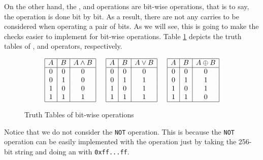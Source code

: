 On the other hand, the \AND, \OR and \XOR operations are bit-wise operations, that is to say, the operation is done bit by bit. As a result, there are not any carries to be considered when operating a pair of bits. As we will see, this is going to make the checks easier to implement for bit-wise operations. Table \ref{tab:truth-tables} depicts the truth tables of \AND, \OR and \XOR operators, respectively.

\begin{figure}[h!]
    \[
    \begin{array}{|c|c|c|}
        \hline
        A 	&B 		&A \land B 	\\
        \hline
        0 	&0 		&0 				\\
        0 	&1 		&0				\\
        1 	&0 		&0 				\\
        1 	&1 		&1 				\\
        \hline
    \end{array}
    \hspace{0.5cm}
    \begin{array}{|c|c|c|}
        \hline
        A 	&B 		&A \lor B 	\\
        \hline
        0 	&0 		&0 				\\
        0 	&1 		&1				\\
        1 	&0 		&1 				\\
        1 	&1 		&1 				\\
        \hline
    \end{array}
    \hspace{0.5cm}
    \begin{array}{|c|c|c|}
        \hline
        A 	&B 		&A \oplus B 	\\
        \hline
        0 	&0 		&0 				\\
        0 	&1 		&1				\\
        1 	&0 		&1 				\\
        1 	&1 		&0 				\\
        \hline
    \end{array}
    \]
    \caption{Truth Tables of bit-wise operations}
    \label{tab:truth-tables}
\end{figure}

Notice that we do not consider the \texttt{NOT} operation. This is because the \texttt{NOT} operation can be easily implemented with the \XOR operation just by taking the 256-bit string and doing an \XOR with \texttt{0xff...ff}.



